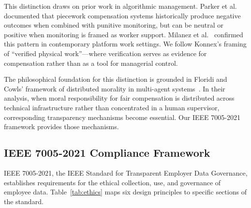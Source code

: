 \documentclass[10pt,twocolumn]{article}
\begin{document}
This distinction draws on prior work in algorithmic management. Parker et al.~\cite{parker2017piecework} documented that piecework compensation systems historically produce negative outcomes when combined with punitive monitoring, but can be neutral or positive when monitoring is framed as worker support. Milanez et al.~\cite{milanez2025algorithmic} confirmed this pattern in contemporary platform work settings. We follow Konnex's framing of ``verified physical work''---where verification serves as evidence for compensation rather than as a tool for managerial control.

The philosophical foundation for this distinction is grounded in Floridi and Cowls' framework of distributed morality in multi-agent systems~\cite{floridi2019unified}. In their analysis, when moral responsibility for fair compensation is distributed across technical infrastructure rather than concentrated in a human supervisor, corresponding transparency mechanisms become essential. Our IEEE 7005-2021 framework provides those mechanisms.

\subsection{IEEE 7005-2021 Compliance Framework}

IEEE 7005-2021, the IEEE Standard for Transparent Employer Data Governance, establishes requirements for the ethical collection, use, and governance of employee data. Table~\ref{tab:ethics} maps six design principles to specific sections of the standard.
\end{document}
